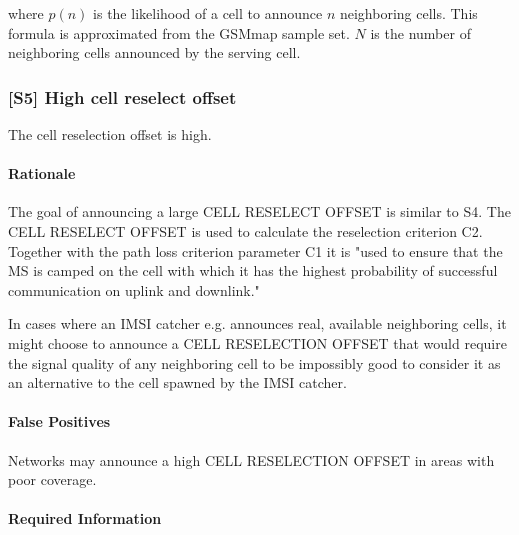 \documentclass[a4paper,11pt,notitlepage,bigheadings,oneside]{scrartcl}
\begin{document}
where $p(n)$ is the likelihood of a cell to announce $n$ neighboring cells.
This formula is approximated from the GSMmap sample set. $N$ is the number of
neighboring cells announced by the serving cell.


\subsubsection{[S5] High cell reselect offset}

The cell reselection offset is high.

\paragraph{Rationale}

The goal of announcing a large CELL RESELECT OFFSET is similar to S4. The CELL
RESELECT OFFSET is used to calculate the reselection criterion C2. Together
with the path loss criterion parameter C1 it is "used to ensure that the MS is
camped on the cell with which it has the highest probability of successful
communication on uplink and downlink." \cite[6.4]{gsm0508}

In cases where an IMSI catcher e.g. announces real, available neighboring
cells, it might choose to announce a CELL RESELECTION OFFSET that would require
the signal quality of any neighboring cell to be impossibly good to consider it
as an alternative to the cell spawned by the IMSI catcher.

%

\paragraph{False Positives}

Networks may announce a high CELL RESELECTION OFFSET in areas with poor
coverage.


\paragraph{Required Information}
\end{document}
